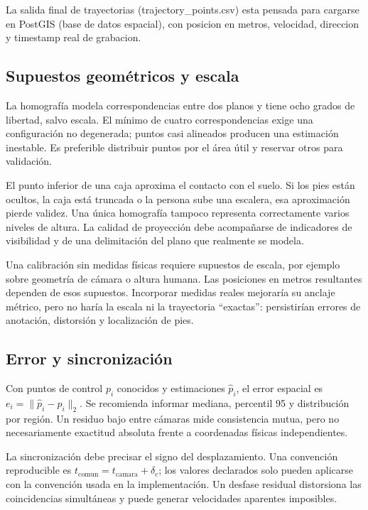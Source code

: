 \documentclass[12pt,letterpaper]{article}
\begin{document}
La salida final de trayectorias (trajectory\_\allowbreak points.csv) esta pensada para cargarse en PostGIS (base de datos espacial), con posicion en metros, velocidad, direccion y timestamp real de grabacion.


\subsection{Supuestos geométricos y escala}
La homografía modela correspondencias entre dos planos y tiene ocho grados de libertad, salvo escala. El mínimo de cuatro correspondencias exige una configuración no degenerada; puntos casi alineados producen una estimación inestable. Es preferible distribuir puntos por el área útil y reservar otros para validación.

El punto inferior de una caja aproxima el contacto con el suelo. Si los pies están ocultos, la caja está truncada o la persona sube una escalera, esa aproximación pierde validez. Una única homografía tampoco representa correctamente varios niveles de altura. La calidad de proyección debe acompañarse de indicadores de visibilidad y de una delimitación del plano que realmente se modela.

Una calibración sin medidas físicas requiere supuestos de escala, por ejemplo sobre geometría de cámara o altura humana. Las posiciones en metros resultantes dependen de esos supuestos. Incorporar medidas reales mejoraría su anclaje métrico, pero no haría la escala ni la trayectoria ``exactas'': persistirían errores de anotación, distorsión y localización de pies.

\subsection{Error y sincronización}
Con puntos de control $p_i$ conocidos y estimaciones $\hat p_i$, el error espacial es $e_i=\|\hat p_i-p_i\|_2$. Se recomienda informar mediana, percentil 95 y distribución por región. Un residuo bajo entre cámaras mide consistencia mutua, pero no necesariamente exactitud absoluta frente a coordenadas físicas independientes.

La sincronización debe precisar el signo del desplazamiento. Una convención reproducible es $t_{\mathrm{comun}}=t_{\mathrm{camara}}+\delta_c$; los valores declarados solo pueden aplicarse con la convención usada en la implementación. Un desfase residual distorsiona las coincidencias simultáneas y puede generar velocidades aparentes imposibles.
\end{document}

